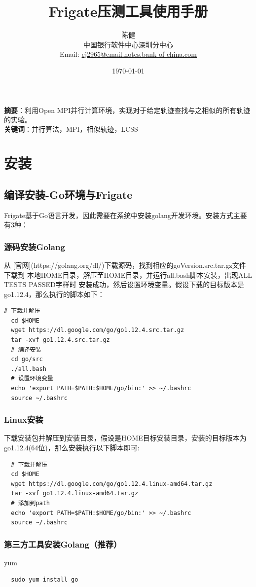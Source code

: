 \documentclass[UTF8]{ctexart}
\title{\huge{\heiti Frigate压测工具使用手册}}
\author{\small{\kaishu 陈健}\\[2pt]
\small{\kaishu 中国银行软件中心深圳分中心}\\[2pt]
\small{Email:}
\url{cj2965@email.notes.bank-of-china.com}
}
\date{\today}
\newcommand{\supercite}[1]{\textsuperscript{\cite{#1}}}
\begin{document}
\maketitle

\begin{flushleft}
\textbf{摘要}：利用Open MPI\supercite{openmpi}并行计算环境，实现对于给定轨迹查找与之相似的所有轨迹的实验。\\[8pt]
\textbf{关键词}：并行算法，MPI，相似轨迹，LCSS
\end{flushleft}
\section{安装}\label{sec1}

\subsection{编译安装-Go环境与Frigate}
Frigate基于Go语言开发，因此需要在系统中安装golang开发环境。安装方式主要有3种：

\subsubsection{源码安装Golang}
从 [官网](https://golang.org/dl/)下载源码，找到相应的goVersion.src.tar.gz文件下载到
本地HOME目录，解压至HOME目录，并运行all.bash脚本安装，出现ALL TESTS PASSED字样时
安装成功，然后设置环境变量。假设下载的目标版本是go1.12.4，那么执行的脚本如下：
\begin{lstlisting}[language={}]
  # 下载并解压
  cd $HOME
  wget https://dl.google.com/go/go1.12.4.src.tar.gz
  tar -xvf go1.12.4.src.tar.gz
  # 编译安装
  cd go/src
  ./all.bash
  # 设置环境变量
  echo 'export PATH=$PATH:$HOME/go/bin:' >> ~/.bashrc
  source ~/.bashrc
\end{lstlisting}
\subsubsection{Linux安装}
下载安装包并解压到安装目录，假设是HOME目标安装目录，安装的目标版本为go1.12.4(64位)，那么安装执行以下脚本即可:
\begin{lstlisting}
  # 下载并解压
  cd $HOME
  wget https://dl.google.com/go/go1.12.4.linux-amd64.tar.gz
  tar -xvf go1.12.4.linux-amd64.tar.gz
  # 添加到path
  echo 'export PATH=$PATH:$HOME/go/bin:' >> ~/.bashrc
  source ~/.bashrc
\end{lstlisting}
\subsubsection{第三方工具安装Golang（推荐）}
yum
\begin{lstlisting}
  sudo yum install go
\end{lstlisting}
\end{document}

